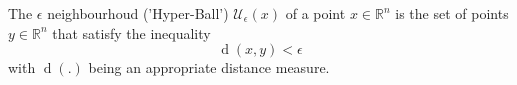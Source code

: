 The $\epsilon$ neighbourhoud ('Hyper-Ball') $\mathcal{U}_{\epsilon}(x)$  of a point $x \in \mathbb{R}^n$ is the set of points $y \in \mathbb{R}^n$ that satisfy the inequality
$$\operatorname{d}(x, y) < \epsilon$$
with $\operatorname{d}(.)$ being an appropriate distance measure.
